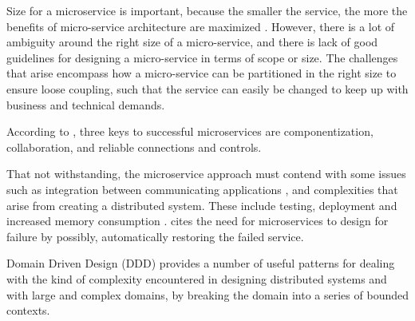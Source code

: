 Size for a microservice is important, because the smaller the service, the more the benefits of micro-service architecture are maximized \cite{newman2015building}. However, there is a lot of ambiguity around the right size  of a micro-service, and there is lack of good guidelines for  designing a micro-service in  terms of scope or size. The challenges that arise encompass how a micro-service can be partitioned in the right size to ensure loose coupling, such that the service can easily be changed to keep up with business and technical demands.

\noindent
According to \cite{owen2016three}, three keys to successful microservices are componentization, collaboration, and reliable connections and controls.

\noindent
That not withstanding, the microservice approach must contend with some issues such as integration between communicating applications \cite{thones2015microservices}, and complexities that arise from creating a distributed system. These include testing, deployment and increased memory consumption \cite{namiot2014micro}. \cite{fowler2014microservices} cites the need for microservices to design for failure by possibly, automatically restoring the failed service.

Domain Driven Design (DDD) provides a number of useful patterns for dealing with the kind of complexity encountered in designing distributed systems and with large and complex domains, by breaking the domain into a series of bounded contexts.